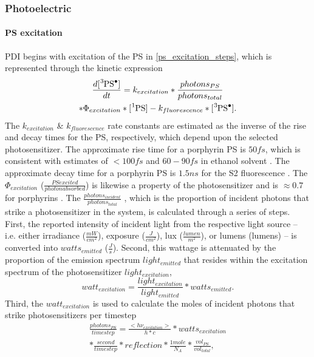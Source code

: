\subsubsection*{Photoelectric}
\paragraph{PS excitation}
PDI begins with excitation of the PS in \cref{ps_excitation_steps}, which is represented through the kinetic expression
\begin{multline} \label{ps_excitation_kinetics}
    \frac{d[\ce{^3PS^.}]}{dt} =  k_{excitation}*\frac{photons_{PS}}{photons_{total}} \\ 
    *\Phi_{excitation}*[\ce{^1PS}] - k_{fluorescence}*[\ce{^3PS^.}]. 
\end{multline}
The $k_{excitation}$ \& $k_{fluorescence}$ rate constants are estimated as the inverse of the rise and decay times for the PS, respectively, which depend upon the selected photosensitizer. The approximate rise time for a porphyrin PS is $50 fs$, which is consistent with estimates of $<100 fs$ \cite{Andersson1999PhotoinducedState} and $60-90 fs$ in ethanol solvent \cite{Gurzadyan1998Time-resolvedZn-tetraphenylporphyrin}. The approximate decay time for a porphyrin PS is $1.5 ns$ for the S2 fluorescence \cite{Akimoto1999UltrafastPorphyrins}. The $\Phi_{excitation}$ ($\frac{PS excited}{photon absorbed}$) is likewise a property of the photosensitizer and is $\approx 0.7$ for porphyrins \cite{Krasnovsky2012PhotochemicalEnvironment}. The $\frac{photons_{incident}}{photons_{total}}$ \cite{Brasel2020AnAgalactiae}, which is the proportion of incident photons that strike a photosensitizer in the system, is calculated through a series of steps. First, the reported intensity of incident light from the respective light source -- i.e. either irradiance ($\frac{mW}{cm^2}$), exposure ($\frac{J}{cm^2}$), lux ($\frac{lumen}{m^2}$), or lumens (lumens) -- is converted into $watts_{emitted}$ ($\frac{J}{s}$). Second, this wattage is attenuated by the proportion of the emission spectrum $light_{emitted}$ that resides within the excitation spectrum of the photosensitizer $light_{excitation}$,
\begin{equation}
    watt_{excitation} = \frac{light_{excitation}}{light_{emitted}}*watts_{emitted}.
\end{equation}
Third, the $watt_{excitation}$ is used to calculate the moles of incident photons that strike photosensitizers per timestep 
\begin{multline} \label{photons_per_second}
    \frac{photons_{PS}}{timestep}=\frac{<h\nu_{excitation}>}{h*c}*watts_{excitation} \\
    *\frac{second}{timestep}*reflection*\frac{1 mole}{N_A}*\frac{vol_{PS}}{vol_{total}},
\end{multline}
